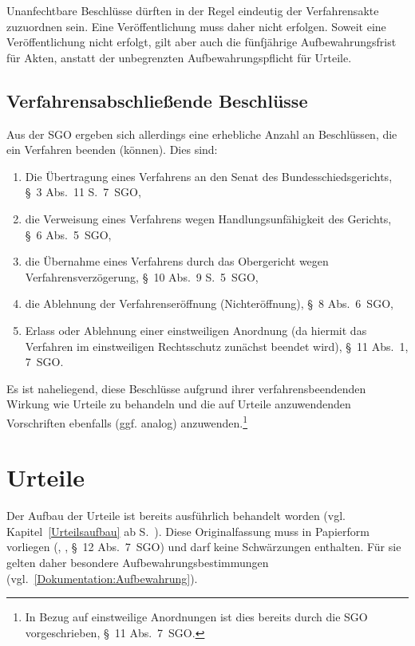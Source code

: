 Unanfechtbare Beschlüsse dürften in der Regel eindeutig der Verfahrensakte zuzuordnen sein.
Eine Veröffentlichung muss daher nicht erfolgen.
Soweit eine Veröffentlichung nicht erfolgt, gilt aber auch die fünfjährige Aufbewahrungsfrist für Akten, anstatt der unbegrenzten Aufbewahrungspflicht für Urteile.


\subsection{Verfahrensabschließende Beschlüsse}
\label{Dokumentation:Beschlüsse:Verfahrensabschließend}
Aus der SGO ergeben sich allerdings eine erhebliche Anzahl an Beschlüssen, die ein Verfahren beenden (können).
Dies sind:
\begin{enumerate}
\item Die Übertragung eines Verfahrens an den Senat des Bundesschiedsgerichts, \S~3 Abs.~11 S.~7~SGO,
\item die Verweisung eines Verfahrens wegen Handlungsunfähigkeit des Gerichts, \S~6 Abs.~5~SGO,
\item die Übernahme eines Verfahrens durch das Obergericht wegen Verfahrensverzögerung, \S~10 Abs.~9 S.~5~SGO,
\item die Ablehnung der Verfahrenseröffnung (Nichteröffnung), \S~8 Abs.~6~SGO,
\item Erlass oder Ablehnung einer einstweiligen Anordnung (da hiermit das Verfahren im einstweiligen Rechtsschutz zunächst beendet wird), \S~11 Abs.~1, 7~SGO.
\end{enumerate}

Es ist naheliegend, diese Beschlüsse aufgrund ihrer verfahrensbeendenden Wirkung wie Urteile zu behandeln und die auf Urteile anzuwendenden Vorschriften ebenfalls (ggf. analog) anzuwenden.\footnote{In Bezug auf einstweilige Anordnungen ist dies bereits durch die SGO vorgeschrieben, \S~11 Abs.~7~SGO.}

\section{Urteile}
\label{Dokumentation:Urteile}
Der Aufbau der Urteile ist bereits ausführlich behandelt worden (vgl. Kapitel~\ref{Urteilsaufbau} ab S.~\pageref{Urteilsaufbau}).
Diese Originalfassung muss in Papierform vorliegen (, , \S~12 Abs.~7~SGO) und darf keine Schwärzungen enthalten.
Für sie gelten daher besondere Aufbewahrungsbestimmungen (vgl.~\ref{Dokumentation:Aufbewahrung}).

